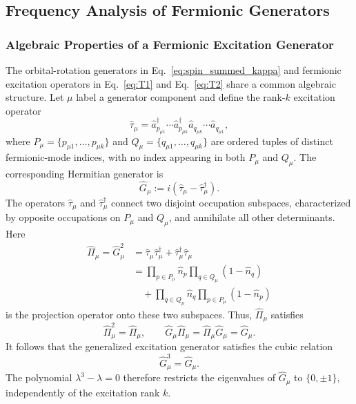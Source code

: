 \documentclass[
 reprint,
 amsmath,amssymb,
 aps,
 physrev,
]{revtex4-2}
\begin{document}
\subsection{Frequency Analysis of Fermionic Generators}
%
\subsubsection{Algebraic Properties of a Fermionic Excitation Generator}
%
The orbital-rotation generators in Eq.~\eqref{eq:spin_summed_kappa} and fermionic excitation operators in Eq.~\eqref{eq:T1} and Eq.~\eqref{eq:T2} share a common algebraic structure.
Let \( \mu \) label a generator component and define the rank-\( k \) excitation operator
%
\begin{equation}
    \hat{\tau}_{\mu}
    =
    \hat{a}_{p_{\mu 1}}^{\dagger}
    \cdots
    \hat{a}_{p_{\mu k}}^{\dagger}
    \hat{a}_{q_{\mu k}}
    \cdots
    \hat{a}_{q_{\mu 1}},
\end{equation}
%
where \( P_{\mu}=\{p_{\mu 1},\ldots,p_{\mu k}\} \) and \( Q_{\mu}=\{q_{\mu 1},\ldots,q_{\mu k}\} \) are ordered tuples of distinct fermionic-mode indices, with no index appearing in both \( P_\mu \) and \( Q_\mu \).
The corresponding Hermitian generator is
%
\begin{equation}
    \label{eq:generator}
    \hat{G}_{\mu} := i\left(\hat{\tau}_{\mu}-\hat{\tau}_{\mu}^{\dagger}\right).
\end{equation}
%
The operators \( \hat{\tau}_\mu \) and \( \hat{\tau}_\mu^\dagger \) connect two disjoint occupation subspaces, characterized by opposite occupations on \( P_\mu \) and \( Q_\mu \), and annihilate all other determinants. Here
%
\begin{equation}
    \begin{aligned}
        \hat{\Pi}_{\mu}
        =\hat{G}_{\mu}^{2}
         & =\hat{\tau}_{\mu}\hat{\tau}_{\mu}^{\dagger}
        +\hat{\tau}_{\mu}^{\dagger}\hat{\tau}_{\mu}    \\
         & =\prod_{p\in P_{\mu}}\hat{n}_{p}
        \prod_{q\in Q_{\mu}}(1-\hat{n}_{q})            \\
         & \quad+\prod_{q\in Q_{\mu}}\hat{n}_{q}
        \prod_{p\in P_{\mu}}(1-\hat{n}_{p})
    \end{aligned}
\end{equation}
%
is the projection operator onto these two subspaces.
Thus, \( \hat{\Pi}_{\mu} \) satisfies
%
\begin{equation}
    \hat{\Pi}_{\mu}^{2}=\hat{\Pi}_{\mu},
    \qquad
    \hat{G}_{\mu}\hat{\Pi}_{\mu}
    =
    \hat{\Pi}_{\mu}\hat{G}_{\mu}
    =
    \hat{G}_{\mu}.
\end{equation}
%
It follows that the generalized excitation generator satisfies the cubic relation
%
\begin{equation}
    \hat{G}_{\mu}^{3} = \hat{G}_{\mu}.
\end{equation}
%
The polynomial \( \lambda^3 - \lambda = 0 \) therefore restricts the eigenvalues of \( \hat{G}_{\mu} \) to \( \{0,\pm 1\} \), independently of the excitation rank \( k \).
%
\end{document}
